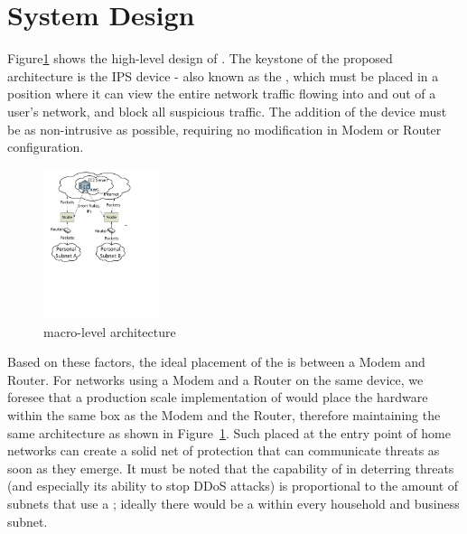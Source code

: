 \section{System Design}


\label{sec:design}

Figure\ref{fig:macro} shows the high-level design of \sysname. The keystone of the proposed architecture is the \sysname IPS device - also known as the \nodename, which must be placed in a position where it can view the entire network traffic flowing into and out of a user's network, and block all suspicious traffic. The addition of the device must be as non-intrusive as possible, requiring no modification in Modem or Router configuration. \\

\begin{figure}
    \centering
    \includegraphics[height=4.4cm]{figs/macroarch.pdf}
    \caption{\sysname macro-level architecture}
    \label{fig:macro}
\end{figure}



Based on these factors, the ideal placement of the \nodename is between a Modem and Router. For networks using a Modem and a Router on the same device, we foresee that a production scale implementation of \sysname would place the \nodename hardware within the same box as the Modem and the Router, therefore maintaining the same architecture as shown in Figure~\ref{fig:macro}. Such \nodenames placed at the entry point of home networks can create a solid net of protection that can communicate threats as soon as they emerge. It must be noted that the capability of \sysname in deterring threats (and especially its ability to stop DDoS attacks) is proportional to the amount of subnets that use a \nodename; ideally there would be a \nodename within every household and business subnet.

\subsection{\nodename}
\label{sec:design:guardian}


